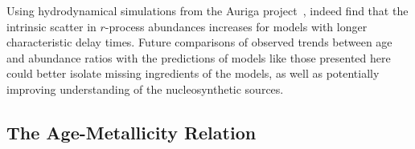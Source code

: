 \documentclass[draft2.tex]{subfiles}
\begin{document}
Using hydrodynamical simulations from the Auriga project~\citep{Grand2017}, 
\citet{vandeVoort2020} indeed find that the intrinsic scatter in $r$-process 
abundances increases for models with longer characteristic delay times. 
Future comparisons of observed trends between age and abundance ratios with the 
predictions of models like those presented here could better isolate missing 
ingredients of the models, as well as potentially improving understanding of 
the nucleosynthetic sources. 

\subsection{The Age-Metallicity Relation} 
\label{sec:obs_comp:amr} 
\end{document}
